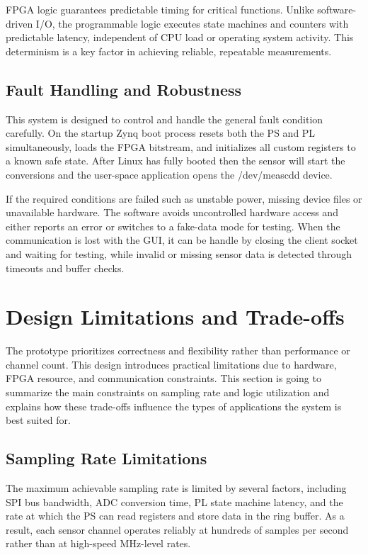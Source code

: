 FPGA logic guarantees predictable timing for critical functions. Unlike software-driven I/O, the programmable logic executes state machines and counters with predictable latency, independent of CPU load or operating system activity. This determinism is a key factor in achieving reliable, repeatable measurements.

\subsection{Fault Handling and Robustness}
This system is designed to control  and handle the general fault condition carefully. On the startup Zynq boot process resets both the PS and PL simultaneously, loads the FPGA bitstream, and initializes all custom registers to a known safe state. After Linux has fully booted then the sensor will start the conversions and the user-space application opens the /dev/meascdd device.

If the required conditions are failed such as unstable power, missing device files or unavailable hardware. The software avoids uncontrolled hardware access and either reports an error or switches to a fake-data mode for testing. When the communication is lost with the GUI, it can be handle by closing the client socket and waiting for testing, while invalid or missing sensor data is detected through timeouts and buffer checks.

\section{Design Limitations and Trade-offs}
The prototype prioritizes correctness and flexibility rather than performance or channel count. This design introduces practical limitations due to hardware, FPGA resource, and communication constraints. This section is going to summarize the main constraints on sampling rate and logic utilization and explains how these trade-offs influence the types of applications the system is best suited for.

\subsection{Sampling Rate Limitations}
The maximum achievable sampling rate is limited by several factors, including SPI bus bandwidth, ADC conversion time, PL state machine latency, and the rate at which the PS can read registers and store data in the ring buffer. As a result, each sensor channel operates reliably at hundreds of samples per second rather than at high-speed MHz-level rates.

